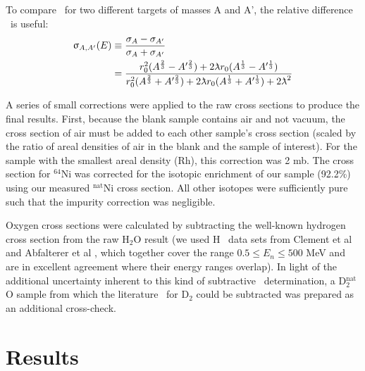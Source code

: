 To compare \tot\ for two different targets of masses A and A', the relative
difference \totRD\ is useful:
\begin{equation} \label{SASRelDiff}
    \begin{split}
        \totRD & \equiv
    \frac{\sigma_{A}-\sigma_{A'}}{\sigma_{A}+\sigma_{A'}} \\
    & =
    \frac{r_{0}^{2}(A^{\frac{2}{3}}-A'^{\frac{2}{3}}) +
    2\lambdabar r_{0}(A^{\frac{1}{3}}-A'^{\frac{1}{3}})}
    {r_{0}^{2}(A^{\frac{2}{3}}+A'^{\frac{2}{3}}) +
    2\lambdabar r_{0}(A^{\frac{1}{3}}+A'^{\frac{1}{3}}) + 2\lambdabar^{2}}
    \end{split}
\end{equation}

A series of small corrections were applied to the raw cross sections to produce
the final results. First, because the blank sample contains air and not vacuum,
the cross section of air must be added to each other sample's cross section (scaled by  
the ratio of areal densities of air in the blank and the sample of interest).
For the sample with the smallest areal density (Rh), this correction was 2 mb.
The cross section for $^{64}$Ni was corrected for the isotopic enrichment of our
sample (92.2\%) using our measured $^{\text{nat}}$Ni cross section. All other isotopes were 
sufficiently pure such that the impurity correction was negligible.

Oxygen cross sections were calculated by
subtracting the well-known hydrogen cross section from the raw H$_{2}$O result
(we used H \tot\ data sets from Clement et al \cite{Clement1972} and Abfalterer
et al \cite{Abfalterer2001}, which together cover the range $0.5 \leq E_n \leq 500$ MeV
and are in excellent agreement where their energy ranges overlap). In light of
the additional uncertainty inherent to this kind of subtractive \tot\
determination, a D$_{2}^{\text{nat}}$O sample from which the literature \tot\ for
D$_{2}$ could be subtracted was prepared as an additional cross-check. 

\section{Results}
